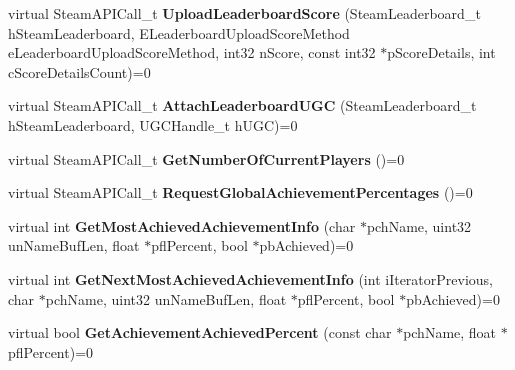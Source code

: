 \begin{DoxyCompactItemize}
\item 
\mbox{\label{class_i_steam_user_stats_a0c554468958a22fea2db5b215c3a629c}} 
virtual Steam\+A\+P\+I\+Call\+\_\+t {\bfseries Upload\+Leaderboard\+Score} (Steam\+Leaderboard\+\_\+t h\+Steam\+Leaderboard, E\+Leaderboard\+Upload\+Score\+Method e\+Leaderboard\+Upload\+Score\+Method, int32 n\+Score, const int32 $\ast$p\+Score\+Details, int c\+Score\+Details\+Count)=0
\item 
\mbox{\label{class_i_steam_user_stats_ab3c5d514309cc0a44bf77890d777d4d9}} 
virtual Steam\+A\+P\+I\+Call\+\_\+t {\bfseries Attach\+Leaderboard\+U\+GC} (Steam\+Leaderboard\+\_\+t h\+Steam\+Leaderboard, U\+G\+C\+Handle\+\_\+t h\+U\+GC)=0
\item 
\mbox{\label{class_i_steam_user_stats_a08b081140556ebbe9fc6662dfc13e5de}} 
virtual Steam\+A\+P\+I\+Call\+\_\+t {\bfseries Get\+Number\+Of\+Current\+Players} ()=0
\item 
\mbox{\label{class_i_steam_user_stats_a87cbff322dcb84273c6d49dbe0bc8975}} 
virtual Steam\+A\+P\+I\+Call\+\_\+t {\bfseries Request\+Global\+Achievement\+Percentages} ()=0
\item 
\mbox{\label{class_i_steam_user_stats_acbcc624f16991042f28c4f0e4f0274ca}} 
virtual int {\bfseries Get\+Most\+Achieved\+Achievement\+Info} (char $\ast$pch\+Name, uint32 un\+Name\+Buf\+Len, float $\ast$pfl\+Percent, bool $\ast$pb\+Achieved)=0
\item 
\mbox{\label{class_i_steam_user_stats_ad34ffdd586272b6b029a94ceccdaf4c4}} 
virtual int {\bfseries Get\+Next\+Most\+Achieved\+Achievement\+Info} (int i\+Iterator\+Previous, char $\ast$pch\+Name, uint32 un\+Name\+Buf\+Len, float $\ast$pfl\+Percent, bool $\ast$pb\+Achieved)=0
\item 
\mbox{\label{class_i_steam_user_stats_aa823894f28563681fc564b0bbe1736d5}} 
virtual bool {\bfseries Get\+Achievement\+Achieved\+Percent} (const char $\ast$pch\+Name, float $\ast$pfl\+Percent)=0
\item 
\mbox{\label{class_i_steam_user_stats_a3d6507c31ba54fd58f20f00f28e15835}} 

\end{DoxyCompactItemize}
